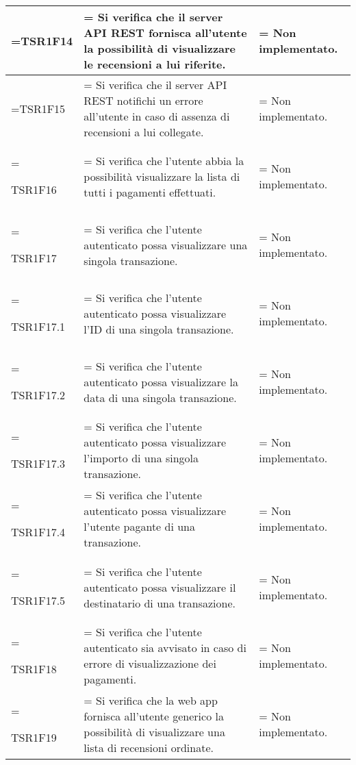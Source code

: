 \begin{xltabular}{\textwidth} {
            >{\hsize\linewidth=\hsize}X
            >{\hsize\linewidth=\hsize}X
            >{\hsize\linewidth=\hsize}X
        }
        TSR1F14 &
        Si verifica che il server API REST fornisca all'utente la possibilità di visualizzare le recensioni a lui riferite. &
        Non implementato.
        \\ \hline

        TSR1F15 &
        Si verifica che il server API REST notifichi un errore all'utente in caso di assenza di recensioni a lui collegate. &
        Non implementato.
        \\ \hline


        TSR1F16 &
        Si verifica che l'utente abbia la possibilità visualizzare la lista di tutti i pagamenti
        effettuati. &
        Non implementato.
        \\ \hline

        TSR1F17 &
        Si verifica che l'utente autenticato possa visualizzare una singola transazione. &
        Non implementato.
        \\ \hline

        TSR1F17.1 &
        Si verifica che l'utente autenticato possa visualizzare l'ID di una singola transazione. &
        Non implementato.
        \\ \hline


        TSR1F17.2 &
        Si verifica che l'utente autenticato possa visualizzare la data di una singola transazione. &
        Non implementato.
        \\ \hline

        TSR1F17.3 &
        Si verifica che l'utente autenticato possa visualizzare l'importo di una singola transazione. &
        Non implementato.
        \\ \hline

        TSR1F17.4 &
        Si verifica che l'utente autenticato possa visualizzare l'utente pagante di una transazione. &
        Non implementato.
        \\ \hline

        TSR1F17.5 &
        Si verifica che l'utente autenticato possa visualizzare il destinatario di una transazione. &
        Non implementato.
        \\ \hline

        TSR1F18 &
        Si verifica che l'utente autenticato sia avvisato in caso di errore di visualizzazione dei pagamenti. &
        Non implementato.
        \\ \hline

        TSR1F19 &
        Si verifica che la web app fornisca all'utente generico la possibilità di visualizzare una lista di recensioni ordinate. &
        Non implementato. 
        \\ \hline


\end{xltabular}
